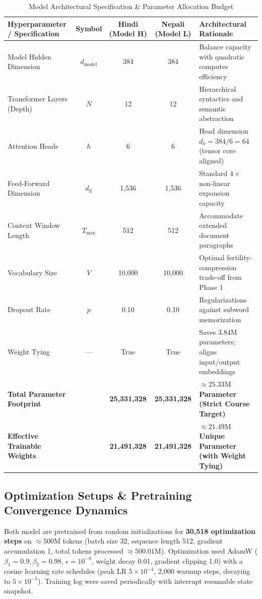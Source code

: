 \documentclass[10pt,a4paper]{article}
\begin{document}
\begin{table}[htbp]
\centering
\scriptsize
\caption{Model Architectural Specification \& Parameter Allocation Budget}
\label{tab:arch_specs}
\begin{tabularx}{\textwidth}{p{4.2cm} c c c L}
\toprule
\textbf{Hyperparameter / Specification} & \textbf{Symbol} & \textbf{Hindi (Model H)} & \textbf{Nepali (Model L)} & \textbf{Architectural Rationale} \\
\midrule
Model Hidden Dimension & $d_{\text{model}}$ & 384 & 384 & Balance capacity with quadratic computes efficiency \\
Transformer Layers (Depth) & $N$ & 12 & 12 & Hierarchical syntactics and semantic abstraction \\
Attention Heads & $h$ & 6 & 6 & Head dimension $d_k = 384 / 6 = 64$ (tensor core aligned) \\
Feed-Forward Dimension & $d_{\text{ff}}$ & 1,536 & 1,536 & Standard $4\times$ non-linear expansion capacity \\
Context Window Length & $T_{\text{max}}$ & 512 & 512 & Accommodate extended document paragraphs \\
Vocabulary Size & $V$ & 10,000 & 10,000 & Optimal fertility-compression trade-off from Phase 1 \\
Dropout Rate & $p$ & 0.10 & 0.10 & Regularizations against subword memorization \\
Weight Tying & --- & True & True & Saves $3.84\text{M}$ parameters; aligns input/output embeddings \\
\midrule
\textbf{Total Parameter Footprint} & & \textbf{25,331,328} & \textbf{25,331,328} & \textbf{$\approx 25.33\text{M}$ Parameter (Strict Course Target)} \\
\textbf{Effective Trainable Weights} & & \textbf{21,491,328} & \textbf{21,491,328} & \textbf{$\approx 21.49\text{M}$ Unique Parameter (with Weight Tying)} \\
\bottomrule
\end{tabularx}
\end{table}

\subsection{Optimization Setups \& Pretraining Convergence Dynamics}
Both model are pretrained from random initializations for \textbf{30,518 optimization steps} on $\approx 500\text{M}$ tokens (batch size 32, sequence length 512, gradient accumulation 1, total tokens processed $\approx 500.01\text{M}$). Optimization used AdamW ($\beta_1=0.9, \beta_2=0.98$, $\epsilon=10^{-8}$, weight decay 0.01, gradient clipping 1.0) with a cosine learning rate schedules (peak LR $5 \times 10^{-4}$, 2,000 warmup steps, decaying to $5 \times 10^{-5}$). Training log were saved periodically with interrupt resumable state snapshot.
\end{document}
